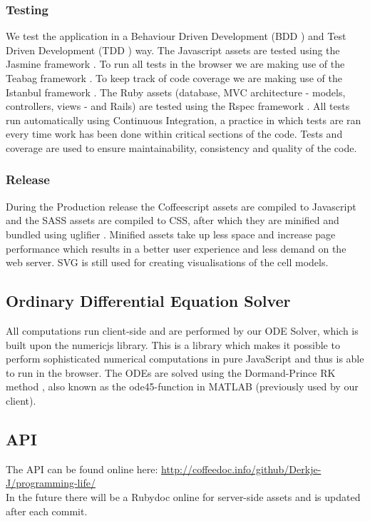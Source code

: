 \documentclass{report}
\begin{document}
			\subsubsection{Testing}
				We test the application in a Behaviour Driven Development (BDD \cite{bdd} ) and Test Driven Development (TDD \cite{tdd} ) way. 
				The Javascript assets are tested using the Jasmine framework \cite{jasmine} . 
				To run all tests in the browser we are making use of the Teabag framework \cite{teabag} . 
				To keep track of code coverage we are making use of the Istanbul framework \cite{istanbul} .
				The Ruby assets (database, MVC architecture - models, controllers, views - and Rails) are tested using the Rspec framework \cite{rspec} .  
				All tests run automatically using Continuous Integration, a practice in which tests are ran every time work has been done within critical sections of the code. 
				Tests and coverage are used to ensure maintainability, consistency and quality of the code.
				
			\subsubsection{Release}
				During the Production release the Coffeescript assets are compiled to Javascript \cite{javascript} and the SASS assets are compiled to CSS, after which they are minified and bundled using uglifier \cite{uglifier} . Minified assets take up less space and increase page performance which results in a better user experience and less demand on the web server. 
				SVG is still used for creating visualisations of the cell models.
		\newpage		
		\subsection{Ordinary Differential Equation Solver}
			All computations run client-side and are performed by our ODE Solver, which is built upon the numericjs \cite{numericjs} library. This is a library which makes it possible to perform sophisticated numerical computations in pure JavaScript and thus is able to run in the browser. The ODEs are solved using the Dormand-Prince RK method \cite{dormandprince} , also known as the ode45-function in MATLAB (previously used by our client).
			
		\subsection{API}
			The API can be found online here: \url{http://coffeedoc.info/github/Derkje-J/programming-life/} \\
			In the future there will be a Rubydoc online for server-side assets and is updated after each commit.
		\newpage
			
\end{document}
